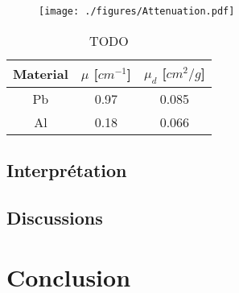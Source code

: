 \documentclass[a4paper,12pt,oneside]{article}
\begin{document}

\begin{figure}[h!]
  \begin{center}
  \texttt{[image: ./figures/Attenuation.pdf]}
  \caption{} \label{fig:attenuation}
  \end{center}
\end{figure}

\begin{table}[h!]
\centering
	\begin{tabular}{|c|c|c|}
	   \hline
		Material & $\mu$ [$cm^{-1}$] & $\mu_d$ [$cm^2/g$]\\
		\hline
		Pb	& 0.97 & 0.085 \\
		Al	& 0.18 & 0.066 \\
	   	\hline
	\end{tabular}
	\caption{TODO}
	\label{tab:attenuation}
\end{table}

\subsection{Interprétation}

\subsection{Discussions}
\section{Conclusion}






\begin{thebibliography}{99}
\end{thebibliography}
\end{document}
